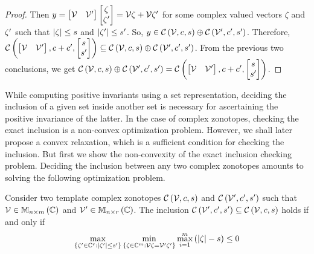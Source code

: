 \begin{proof}
Then $y=\begin{bmatrix}\mathcal{V}
&\mathcal{V}^\prime\end{bmatrix}\begin{bmatrix}\zeta\\ \zeta^\prime\end{bmatrix}=\mathcal{V}\zeta+\mathcal{V}\zeta^\prime$
for some complex valued vectors $\zeta$ and $\zeta^\prime$ such that $\left|\zeta\right|\leq s$ and
$\left|\zeta^\prime\right|\leq s^\prime$.  So,
$y\in\mathit{\mathcal{C}}\left(\mathcal{V},c,s\right)\oplus \mathit{\mathcal{C}}\left(\mathcal{V}^\prime,c^\prime,s^\prime\right)$.
Therefore, $\mathit{\mathcal{C}}\left(\begin{bmatrix}\mathcal{V}
& \mathcal{V}^\prime\end{bmatrix},c+c^\prime,\begin{bmatrix}s\\s^\prime\end{bmatrix}\right) \subseteq \mathit{\mathcal{C}}\left(\mathcal{V},c,s\right)\oplus \mathit{\mathcal{C}}\left(\mathcal{V}^\prime,c^\prime,s^\prime\right)$.
From the previous two conclusions, we get
$\mathit{\mathcal{C}}\left(\mathcal{V},c,s\right)\oplus \mathit{\mathcal{C}}\left(\mathcal{V}^\prime,c^\prime,s^\prime\right)
= \mathit{\mathcal{C}}\left(\begin{bmatrix}\mathcal{V}
& \mathcal{V}^\prime\end{bmatrix},c+c^\prime,\begin{bmatrix}s\\s^\prime\end{bmatrix}\right)$.
\end{proof}
%
While computing positive invariants using a set representation,
deciding the inclusion of a given set inside another set is necessary
for ascertaining the positive invariance of the latter.  In the case
of complex zonotopes, checking the exact inclusion is a non-convex
optimization problem.  However, we shall later propose a convex
relaxation, which is a sufficient condition for checking the
inclusion.  But first we show the non-convexity of the exact inclusion
checking problem.  Deciding the inclusion between any two complex
zonotopes amounts to solving the following optimization problem.
%
\begin{lemma}
Consider two template complex zonotopes
$\mathit{\mathcal{C}}\left(\mathcal{V},c,s\right)$ and
$\mathit{\mathcal{C}}\left(\mathcal{V}^\prime,c^\prime,s^\prime\right)$ such that
$\mathcal{V}\in\mathbb{M}_{n\times m}\left(\mathbb{C}\right)$ and $\mathcal{V}^\prime\in\mathbb{M}_{n\times r}\left(\mathbb{C}\right)$.  The inclusion
$\mathit{\mathcal{C}}\left(\mathcal{V}^\prime,c^\prime,s^\prime\right)\subseteq\mathit{\mathcal{C}}\left(\mathcal{V},c,s\right)$
holds if and only if
\begin{equation}\label{eqn:exact-inclusion}
\max_{\left\{\zeta^\prime\in\mathbb{C}^{r}:\left|\zeta^\prime\right|\leq s^\prime\right\}}\min_{\left\{\zeta\in\mathbb{C}^m:\mathcal{V}\zeta=\mathcal{V}^\prime\zeta^\prime\right\}}\max_{i=1}^m\left(\left|\zeta\right|-s\right)\leq 0
\end{equation}
\end{lemma}
